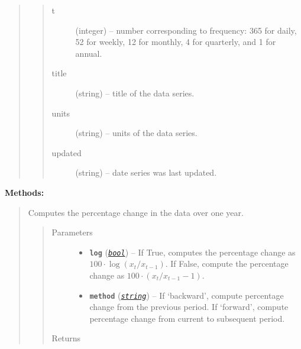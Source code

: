 \documentclass[letterpaper,10pt,openany,oneside]{sphinxmanual}
\begin{document}
\begin{fulllineitems}
\begin{quote}
\begin{quote}
\begin{description}
\item[{t}] \leavevmode
(integer) -- number corresponding to frequency: 365 for daily, 52 for weekly, 12 for monthly, 4 for quarterly, and 1 for annual.

\item[{title}] \leavevmode
(string) -- title of the data series.

\item[{units}] \leavevmode
(string) -- units of the data series.

\item[{updated}] \leavevmode
(string) -- date series was last updated.

\end{description}\end{quote}
\end{quote}

\textbf{Methods:}
\begin{quote}

\begin{fulllineitems}
\label{series_class:fredpy.series.apc}
Computes the percentage change in the data over one year.
\begin{quote}\begin{description}
\item[{Parameters}] \leavevmode\begin{itemize}
\item {} 
\textbf{\texttt{log}} (\href{https://docs.python.org/library/functions.html\#bool}{\emph{\texttt{bool}}}) -- If True, computes the percentage change as \(100\cdot\log(x_{t}/x_{t-1})\). If False, compute the percentage change as \(100\cdot\left( x_{t}/x_{t-1} - 1\right)\).

\item {} 
\textbf{\texttt{method}} (\href{https://docs.python.org/library/string.html\#module-string}{\emph{\texttt{string}}}) -- If `backward', compute percentage change from the previous period. If `forward', compute percentage change from current to subsequent period.

\end{itemize}

\item[{Returns}] \leavevmode
{\hyperref[series_class:fredpy.series]{}}

\end{description}\end{quote}


\end{fulllineitems}
\end{quote}
\end{fulllineitems}
\end{document}
